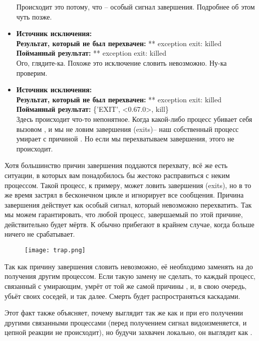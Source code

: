 \begin{itemize}
    Происходит это потому, что  \--- особый сигнал завершения.
    Подробнее об этом чуть позже.
\item
    \textbf{Источник исключения:} \\
    \textbf{Результат, который не был перехвачен:} ** exception exit: killed\\
    \textbf{Пойманный результат:} ** exception exit: killed\\
    Ого, глядите\--ка.
    Похоже это исключение словить невозможно.
    Ну\--ка проверим.
\item
    \textbf{Источник исключения:} \\
    \textbf{Результат, который не был перехвачен:} ** exception exit: killed\\
    \textbf{Пойманный результат:} \{'EXIT', <0.67.0>, kill\}\\
    Здесь происходит что\--то непонятное.
    Когда какой\--либо процесс убивает себя вызовом , и мы не ловим  завершения (exits)\--- наш собственный процесс умирает с причиной .
    Но если мы перехватываем завершения, этого не происходит.
\end{itemize}

Хотя большинство причин завершения поддаются перехвату, всё же есть ситуации, в которых вам понадобилось бы жестоко расправиться с неким процессом.
Такой процесс, к примеру, может ловить завершения (exits), но в то же время застрял в бесконечном цикле и игнорирует все сообщения.
Причина завершения  действует как особый сигнал, который невозможно перехватить.
Так мы можем гарантировать, что любой процесс, завершаемый по этой причине, действительно будет мёртв.
К  обычно прибегают в крайнем случае, когда больше ничего не срабатывает.
\begin{wrapfigure}{r}{0.4\linewidth}
    \texttt{[image: trap.png]}
\end{wrapfigure}

Так как причину завершения  словить невозможно, её необходимо заменять на  до получения другим процессом. 
Если такую замену не сделать, то каждый процесс, связанный с умирающим, умрёт от той же самой причины , и, в свою очередь, убьёт своих соседей, и так далее.
Смерть будет распространяться каскадами.

Этот факт также объясняет, почему  выглядит так же как и  при его получении другими связанными процессами (перед получением сигнал видоизменяется, и цепной реакции не происходит), но будучи захвачен локально, он выглядит как .

